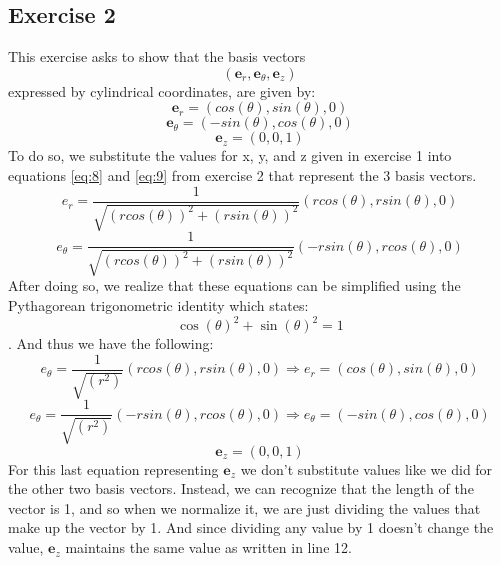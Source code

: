 \documentclass{article}
\begin{document}
\subsection{Exercise 2}
This exercise asks to show that the basis vectors
\begin{equation}
(\mathbf{e}_r, \mathbf{e}_\theta, \mathbf{e}_z)
\end{equation}
expressed by cylindrical coordinates, are given by:
\begin{equation}
\mathbf{e}_r = (cos(\theta), sin(\theta), 0)
\end{equation}
\begin{equation}
\mathbf{e}_\theta = (-sin(\theta), cos(\theta), 0)
\end{equation}
\begin{equation}
\mathbf{e}_z = (0,0,1)
\end{equation}
To do so, we substitute the values for x, y, and z given in exercise 1 into equations \ref{eq:8} and \ref{eq:9} from exercise 2 that represent the 3 basis vectors.
\begin{equation}
    e_{r}= \frac{1}{\sqrt{(r cos(\theta))^2+(r sin(\theta))^2}}(r cos(\theta), r sin(\theta),0)
\end{equation}
\begin{equation}
    e_{\theta}= \frac{1}{\sqrt{(r cos(\theta))^2+(r sin(\theta))^2}}(-r sin(\theta), r cos(\theta),0) 
\end{equation}
After doing so, we realize that these equations can be simplified using the Pythagorean trigonometric identity which states: \[\cos(\theta)^{2}+\sin(\theta)^{2}=1\]. And thus we have the following:
\begin{equation}
    e_{\theta}= \frac{1}{\sqrt{(r^2)}}(r cos(\theta), r sin(\theta),0) \Rightarrow e_{r} = (cos(\theta),sin(\theta),0)
\end{equation}
\begin{equation}
    e_{\theta}= \frac{1}{\sqrt{(r^2)}}(-r sin(\theta), r cos(\theta),0) \Rightarrow e_{\theta} = (-sin(\theta),cos(\theta),0)
\end{equation}
\begin{equation}
    \mathbf{e}_z = (0,0,1)
\end{equation}
For this last equation representing $\mathbf{e}_z$ we don't substitute values like we did for the other two basis vectors. Instead, we can recognize that the length of the vector is 1, and so when we normalize it, we are just dividing the values that make up the vector by 1. And since dividing any value by 1 doesn't change the value, $\mathbf{e}_z$ maintains the same value as written in line 12.
\end{document}
